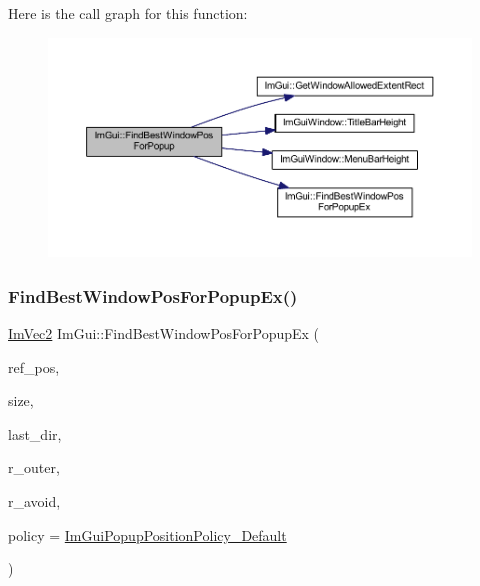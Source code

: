 Here is the call graph for this function\+:
\nopagebreak
\begin{figure}[H]
\begin{center}
\leavevmode
\includegraphics[width=350pt]{namespace_im_gui_a310ff87cbe678e2c632bf1f5577a7fbd_cgraph}
\end{center}
\end{figure}
\mbox{\label{namespace_im_gui_a4159d978951d11bb8be459911ae58db2}} 
\subsubsection{\texorpdfstring{Find\+Best\+Window\+Pos\+For\+Popup\+Ex()}{FindBestWindowPosForPopupEx()}}
{\footnotesize\ttfamily \mbox{\hyperlink{struct_im_vec2}{Im\+Vec2}} Im\+Gui\+::\+Find\+Best\+Window\+Pos\+For\+Popup\+Ex (\begin{DoxyParamCaption}\item[{const \mbox{\hyperlink{struct_im_vec2}{Im\+Vec2}} \&}]{ref\+\_\+pos,  }\item[{const \mbox{\hyperlink{struct_im_vec2}{Im\+Vec2}} \&}]{size,  }\item[{\mbox{\hyperlink{imgui_8h_a874086389bc27cc9647118d22a806403}{Im\+Gui\+Dir}} $\ast$}]{last\+\_\+dir,  }\item[{const \mbox{\hyperlink{struct_im_rect}{Im\+Rect}} \&}]{r\+\_\+outer,  }\item[{const \mbox{\hyperlink{struct_im_rect}{Im\+Rect}} \&}]{r\+\_\+avoid,  }\item[{\mbox{\hyperlink{imgui__internal_8h_a9c122103feadc7b225fc21698ff0f4d8}{Im\+Gui\+Popup\+Position\+Policy}}}]{policy = {\ttfamily \mbox{\hyperlink{imgui__internal_8h_a9c122103feadc7b225fc21698ff0f4d8ab8a9815cfc6ed3f721aa8e75d960dbdf}{Im\+Gui\+Popup\+Position\+Policy\+\_\+\+Default}}} }\end{DoxyParamCaption})}

